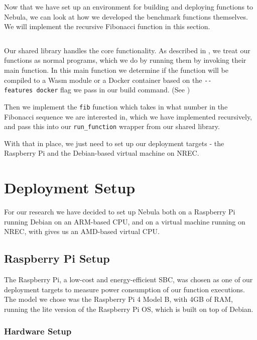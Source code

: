 \documentclass[
  table]{report}
\begin{document}
Now that we have set up an environment for building and deploying
functions to Nebula, we can look at how we developed the benchmark
functions themselves. We will implement the recursive Fibonacci function
in this section.

\inputminted{rust}{assets/code/fib-recursive.rs}

Our shared library handles the core functionality. As described in
, we treat our functions as normal
programs, which we do by running them by invoking their main function.
In this main function we determine if the function will be compiled to a
\ac{Wasm} module or a Docker container based on the
\texttt{-\/-features\ docker} flag we pass in our build command. (See
)

Then we implement the \texttt{fib} function which takes in what number
in the Fibonacci sequence we are interested in, which we have
implemented recursively, and pass this into our \texttt{run\_function}
wrapper from our shared library.

With that in place, we just need to set up our deployment targets - the
Raspberry Pi and the Debian-based virtual machine on \ac{NREC}.

\section{Deployment Setup}

For our research we have decided to set up Nebula both on a Raspberry Pi
running Debian on an ARM-based CPU, and on a virtual machine running on
\ac{NREC}, with gives us an AMD-based virtual CPU.

\subsection{Raspberry Pi Setup}

The Raspberry Pi, a low-cost and energy-efficient \ac{SBC}, was chosen
as one of our deployment targets to measure power consumption of our
function executions. The model we chose was the Raspberry Pi 4 Model B,
with 4GB of RAM, running the lite version of the Raspberry Pi OS, which
is built on top of Debian.

\subsubsection{Hardware Setup}
\end{document}
